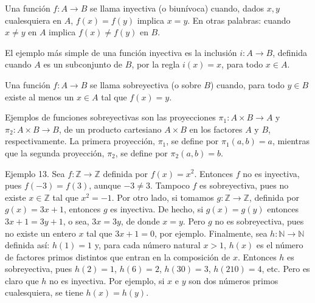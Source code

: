 \documentclass[12pt,oneside]{book}
\begin{document}
Una función \(f: A \to B\) se llama inyectiva (o biunívoca) cuando, dados \(x, y\) cualesquiera en \(A\), \(f(x) = f(y)\) implica \(x = y\). En otras palabras: cuando \(x \neq y\) en \(A\) implica \(f(x) \neq f(y)\) en \(B\).

El ejemplo más simple de una función inyectiva es la inclusión \(i: A \to B\), definida cuando \(A\) es un subconjunto de \(B\), por la regla \(i(x) = x\), para todo \(x \in A\).

Una función \(f: A \to B\) se llama sobreyectiva (o sobre \(B\)) cuando, para todo \(y \in B\) existe al menos un \(x \in A\) tal que \(f(x) = y\).

Ejemplos de funciones sobreyectivas son las proyecciones \(\pi_1: A \times B \to A\) y \(\pi_2: A \times B \to B\), de un producto cartesiano \(A \times B\) en los factores \(A\) y \(B\), respectivamente. La primera proyección, \(\pi_1\), se define por \(\pi_1(a, b) = a\), mientras que la segunda proyección, \(\pi_2\), se define por \(\pi_2(a, b) = b\).

Ejemplo 13. Sea \(f: \mathbb{Z} \to \mathbb{Z}\) definida por \(f(x) = x^2\). Entonces \(f\) no es inyectiva, pues \(f(-3) = f(3)\), aunque \(-3 \neq 3\). Tampoco \(f\) es sobreyectiva, pues no existe \(x \in \mathbb{Z}\) tal que \(x^2 = -1\). Por otro lado, si tomamos \(g: \mathbb{Z} \to \mathbb{Z}\), definida por \(g(x) = 3x + 1\), entonces \(g\) es inyectiva. De hecho, si \( g(x) = g(y) \) entonces \( 3x + 1 = 3y + 1 \), o sea, \( 3x = 3y \), de donde \( x = y \). Pero \( g \) no es sobreyectiva, pues no existe un entero \( x \) tal que \( 3x + 1 = 0 \), por ejemplo. Finalmente, sea \( h: \mathbb{N} \to \mathbb{N} \) definida así: \( h(1) = 1 \) y, para cada número natural \( x > 1 \), \( h(x) \) es el número de factores primos distintos que entran en la composición de \( x \). Entonces \( h \) es sobreyectiva, pues \( h(2) = 1 \), \( h(6) = 2 \), \( h(30) = 3 \), \( h(210) = 4 \), etc. Pero es claro que \( h \) no es inyectiva. Por ejemplo, si \( x \) e \( y \) son dos números primos cualesquiera, se tiene \( h(x) = h(y) \).
\end{document}

